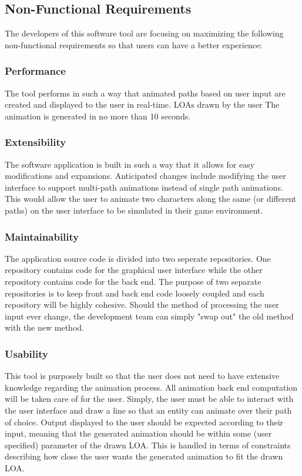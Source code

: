 \subsection{Non-Functional Requirements}
The developers of this software tool are focusing on maximizing the following non-functional requirements so that users can have a better experience:

\subsubsection{Performance}
The tool performs in such a way that animated paths based on user input are created and displayed to the user in real-time. LOAs drawn by the user The animation is generated in no more than 10 seconds. 

\subsubsection{Extensibility}
The software application is built in such a way that it allows for easy modifications and expansions. Anticipated changes include modifying the user interface to support multi-path animations instead of single path animations. This would allow the user to animate two characters along the same (or different paths) on the user interface to be simulated in their game environment.

\subsubsection{Maintainability}
The application source code is divided into two seperate repositories. One repository contains code for the graphical user interface while the other repository contains code for the back end. The purpose of two separate repositories is to keep front and back end code loosely coupled and each repository will be highly cohesive. Should the method of processing the user input ever change, the development team can simply "swap out" the old method with the new method.

\subsubsection{Usability}
This tool is purposely built so that the user does not need to have extensive knowledge regarding the animation process. All animation back end computation will be taken care of for the user. Simply, the user must be able to interact with the user interface and draw a line so that an entity can animate over their path of choice. Output displayed to the user should be expected according to their input, meaning that the generated animation should be within some (user specified) parameter of the drawn LOA. This is handled in terms of constraints describing how close the user wants the generated animation to fit the drawn LOA.


